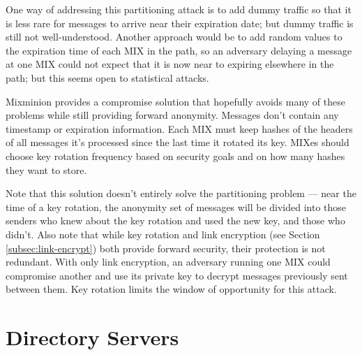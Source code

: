 \documentclass{llncs}
\begin{document}

One way of addressing this partitioning attack is to add dummy traffic
so that it is less rare for messages to arrive near their expiration date;
but dummy traffic is still not well-understood. Another approach would
be to add random values to the expiration time of each MIX in the path,
so an adversary delaying a message at one MIX could not expect that it
is now near to expiring elsewhere in the path; but this seems open to
statistical attacks.


Mixminion provides a compromise solution that hopefully avoids many of
these problems while still providing forward anonymity. Messages don't
contain any timestamp or expiration information. Each MIX must keep
hashes of the headers of all messages it's processed since the last time
it rotated its key. MIXes should choose key rotation frequency based on
security goals and on how many hashes they want to store.

Note that this solution doesn't entirely solve the partitioning problem
--- near the time of a key rotation, the anonymity set of messages will
be divided into those senders who knew about the key rotation and used
the new key, and those who didn't.
Also note that while key rotation and link encryption (see Section
\ref{subsec:link-encrypt}) both provide forward security, their protection
is not redundant. With only link encryption, an adversary running
one MIX could compromise another and use its private key to decrypt
messages previously sent between them. Key rotation limits the window
of opportunity for this attack.


\section{Directory Servers}
\label{sec:dir-servers}
\end{document}
